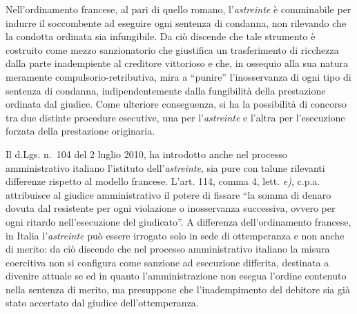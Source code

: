 \documentclass[12pt,it,a4paper,]{report}
\begin{document}
Nell'ordinamento francese, al pari di quello romano, l'\emph{astreinte}
è comminabile per indurre il soccombente ad eseguire ogni sentenza di
condanna, non rilevando che la condotta ordinata sia infungibile. Da ciò
discende che tale strumento è costruito come mezzo sanzionatorio che
giustifica un trasferimento di ricchezza dalla parte inadempiente al
creditore vittorioso e che, in ossequio alla sua natura meramente
compulsorio-retributiva, mira a ``punire'' l'inosservanza di ogni tipo
di sentenza di condanna, indipendentemente dalla fungibilità della
prestazione ordinata dal giudice. Come ulteriore conseguenza, si ha la
possibilità di concorso tra due distinte procedure esecutive, una per
l'\emph{astreinte} e l'altra per l'esecuzione forzata della prestazione
originaria.

Il d.Lgs. n.~104 del 2 luglio 2010, ha introdotto anche nel processo
amministrativo italiano l'istituto dell'\emph{astreinte}, sia pure con
talune rilevanti differenze rispetto al modello francese. L'art. 114,
comma 4, lett. \emph{e)}, c.p.a. attribuisce al giudice amministrativo
il potere di fissare ``la somma di denaro dovuta dal resistente per ogni
violazione o inosservanza successiva, ovvero per ogni ritardo
nell'esecuzione del giudicato''. A differenza dell'ordinamento francese,
in Italia l'\emph{astreinte} può essere irrogato solo in sede di
ottemperanza e non anche di merito: da ciò discende che nel processo
amministrativo italiano la misura coercitiva non si configura come
sanzione ad esecuzione differita, destinata a divenire attuale se ed in
quanto l'amministrazione non esegua l'ordine contenuto nella sentenza di
merito, ma presuppone che l'inadempimento del debitore sia già stato
accertato dal giudice dell'ottemperanza.
\end{document}
